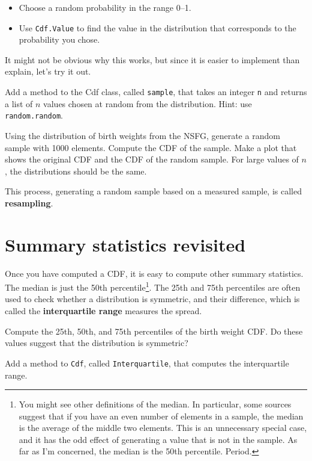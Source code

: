 \documentclass[10pt]{book}
\begin{document}
\begin{itemize}

\item Choose a random probability in the range 0--1.

\item Use {\tt Cdf.Value} to find the value in the distribution
that corresponds to the probability you chose.

\end{itemize}

It might not be obvious why this works, but since it is easier
to implement than explain, let's try it out.

\begin{ex}

Add a method to the Cdf class, called {\tt sample}, that takes
an integer {\tt n} and returns a list of $n$ values chosen at
random from the distribution.  Hint: use {\tt random.random}.

Using the distribution of birth weights from the NSFG, generate a
random sample with 1000 elements.  Compute the CDF of the sample.
Make a plot that shows the original CDF and the CDF of the random
sample.  For large values of $n$, the distributions should be
the same.

\end{ex}

This process, generating a random sample based on a measured sample,
is called {\bf resampling}.


\section{Summary statistics revisited}

Once you have computed a CDF, it is easy to compute other summary
statistics.  The median is just the 50th percentile\footnote{You might
see other definitions of the median.  In particular,
some sources suggest that if you have an even number of elements in
a sample, the median is the average of the middle two elements.
This is an unnecessary special case, and it has the odd effect of
generating a value that is not in the sample.  As far
as I'm concerned, the median is the 50th percentile.  Period.}.
The 25th and 75th percentiles are often used to check whether
a distribution is symmetric, and their difference, which is called
the {\bf interquartile range} measures the spread.

\begin{ex}
Compute the 25th, 50th, and 75th percentiles of the birth weight
CDF.  Do these values suggest that the distribution is symmetric?

Add a method to {\tt Cdf}, called {\tt Interquartile}, that computes
the interquartile range.
\end{ex}
\end{document}
